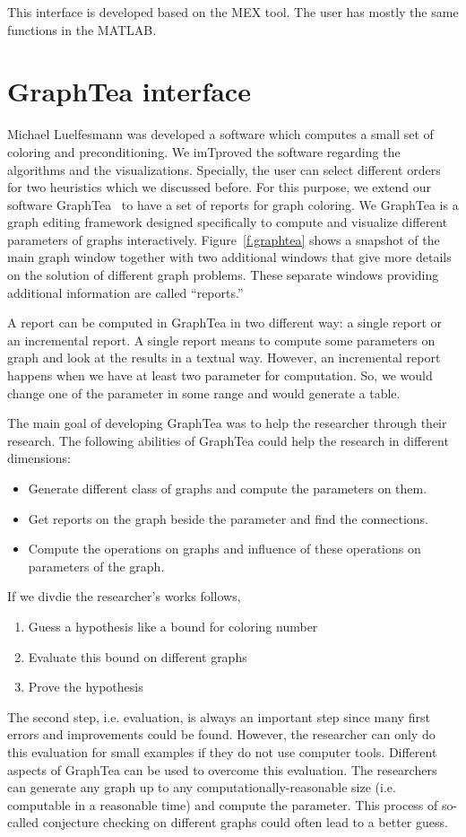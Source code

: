 \documentclass[12pt, oneside]{book}
\begin{document}
This interface is developed based on the MEX tool. 
The user has mostly the same functions in the MATLAB.
\section{GraphTea interface}
Michael Luelfesmann was developed a software which computes a small set of 
coloring and preconditioning. We imTproved the software regarding the algorithms
and the visualizations. Specially, the user can select different orders for two heuristics
which we discussed before.
For this purpose, we extend our software GraphTea~
\cite{2014:07,2014:15,2014:16,2015:05,2015:06,2015:07,2015:08} to have a
set of reports for graph coloring. We
GraphTea is a graph editing framework designed specifically to compute and visualize
different parameters of graphs interactively.
Figure~\ref{f.graphtea} shows a snapshot of the main
graph window together with two additional windows that give more details on the solution
of different graph problems. These separate windows providing additional information are
called ``reports.''

A report can be computed in GraphTea in two different way:
a single report or an incremental report.
A single report means to compute some parameters on graph and look at the results
in a textual way. However, an incremental report happens when we have at least 
two parameter for computation. So, we would change one of the parameter in
some range and would generate a table.

The main goal of developing GraphTea was to help the researcher through their research.
The following abilities of GraphTea could help the research in different dimensions:
\begin{itemize}
\item Generate different class of graphs and compute the parameters on them.
\item Get reports on the graph beside the parameter and find the connections.
\item Compute the operations on graphs and influence of these operations on parameters
of the graph. 
\end{itemize}

If we divdie the researcher's works follows,
\begin{enumerate}
\item Guess a hypothesis like a bound for coloring number
\item Evaluate this bound on different graphs
\item Prove the hypothesis
\end{enumerate}
The second step, i.e. evaluation, is always an important step since many first errors and 
improvements could be found.
However, the researcher can only do this evaluation for small examples if they do not
use computer tools. 
Different aspects of GraphTea can be used to overcome this evaluation.
The researchers can generate any graph up to any computationally-reasonable size
(i.e. computable in a reasonable time) and compute the parameter.
This process of so-called conjecture checking on different graphs could often lead to a better guess.
\end{document}
